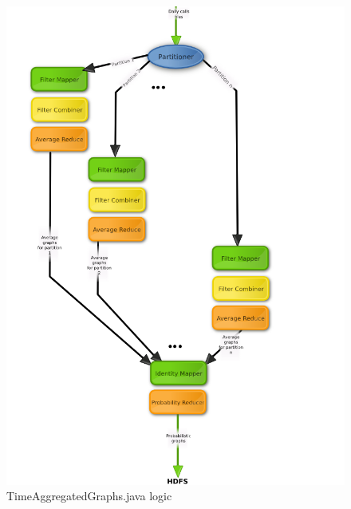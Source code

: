\begin{figure}
	\centering
    \includegraphics[scale=0.7]{aggregation.png}
    \caption{TimeAggregatedGraphs.java logic}
    \label{fig:aggregated}
\end{figure}
\newpage
